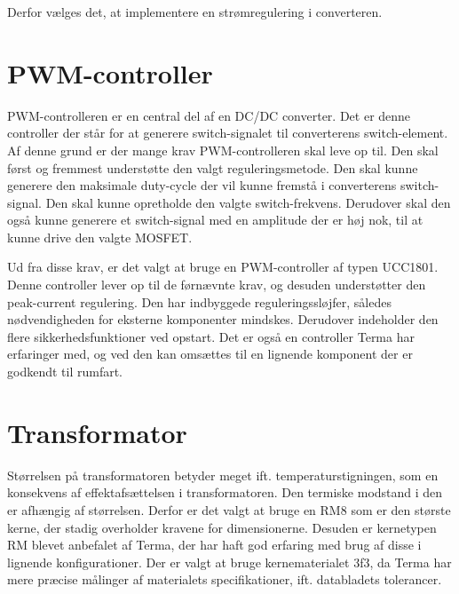 \noindent Derfor vælges det, at implementere en strømregulering i converteren. 

\section{PWM-controller}
PWM-controlleren er en central del af en DC/DC converter. Det er denne controller der står for at generere switch-signalet til converterens switch-element. Af denne grund er der mange krav PWM-controlleren skal leve op til. Den skal først og fremmest understøtte den valgt reguleringsmetode. Den skal kunne generere den maksimale duty-cycle der vil kunne fremstå i converterens switch-signal. Den skal kunne opretholde den valgte switch-frekvens. Derudover skal den også kunne generere et switch-signal med en amplitude der er høj nok, til at kunne drive den valgte MOSFET.

Ud fra disse krav, er det valgt at bruge en PWM-controller af typen UCC1801\cite{UCC1801}. Denne controller lever op til de førnævnte krav, og desuden understøtter den peak-current regulering. Den har indbyggede reguleringssløjfer, således nødvendigheden for eksterne komponenter mindskes. Derudover indeholder den flere sikkerhedsfunktioner ved opstart. Det er også en controller Terma har erfaringer med, og ved den kan omsættes til en lignende komponent der er godkendt til rumfart. 

\section{Transformator} \label{Transana}
Størrelsen på transformatoren betyder meget ift. temperaturstigningen, som en konsekvens af effektafsættelsen i transformatoren. Den termiske modstand i den er afhængig af størrelsen\cite{epcos-cores}. Derfor er det valgt at bruge en RM8\cite{RM8} som er den største kerne, der stadig overholder kravene for dimensionerne. Desuden er kernetypen RM blevet anbefalet af Terma, der har haft god erfaring med brug af disse i lignende konfigurationer. Der er valgt at bruge kernematerialet 3f3\cite{3f3}, da Terma har mere præcise målinger af materialets specifikationer, ift. databladets tolerancer.


